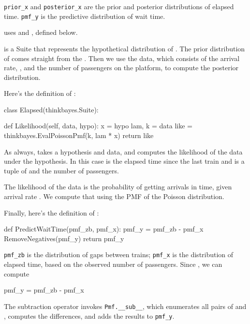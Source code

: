 \documentclass[12pt]{book}
\theoremstyle{exercise}
\begin{document}
\verb"prior_x" and \verb"posterior_x" are the prior and
posterior distributions of elapsed time.  \verb"pmf_y" is
the predictive distribution of wait time.

 uses  and ,
defined below.

 is a Suite that represents the hypothetical
distribution of .  The prior distribution of 
comes straight from the .  Then we
use the data, which consists of the arrival rate, ,
and the number of passengers on the platform, to compute
the posterior distribution.

Here's the definition of :

\begin{code}
class Elapsed(thinkbayes.Suite):

    def Likelihood(self, data, hypo):
        x = hypo
        lam, k = data
        like = thinkbayes.EvalPoissonPmf(k, lam * x)
        return like
\end{code}

As always,  takes a hypothesis and data, and
computes the likelihood of the data under the hypothesis.
In this case  is the elapsed time since the last train
and  is a tuple of  and the number of
passengers.

The likelihood of the data is the probability of getting
 arrivals in  time, given arrival rate
.  We compute that using the PMF of the Poisson
distribution.

Finally, here's the definition of :

\begin{code}
def PredictWaitTime(pmf_zb, pmf_x):
    pmf_y = pmf_zb - pmf_x
    RemoveNegatives(pmf_y)
    return pmf_y
\end{code}

\verb"pmf_zb" is the distribution of gaps between trains;
\verb"pmf_x" is the distribution of elapsed time, based on
the observed number of passengers.  Since ,
we can compute

\begin{code}
    pmf_y = pmf_zb - pmf_x
\end{code}

The subtraction operator invokes \verb"Pmf.__sub__", which enumerates
all pairs of  and , computes the differences, and adds
the results to \verb"pmf_y".
\end{document}
